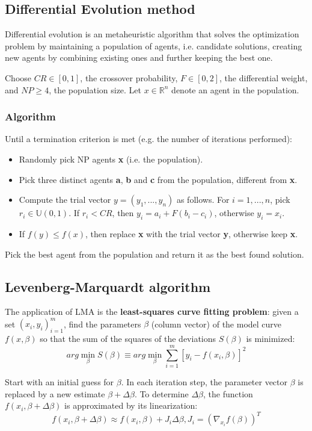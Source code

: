 \documentclass[a4paper,article,14pt]{extarticle}
\begin{document}
	\subsection{Differential Evolution method}
	Differential evolution is an metaheuristic algorithm that solves the optimization problem by maintaining a population of agents, i.e. candidate solutions, creating new agents by combining existing ones and further keeping the best one.
	
	Choose $CR \in [0,1]$, the crossover probability, $F \in[0,2]$, the differential weight, and $NP \geq 4$, the population size. Let $x\in \mathbb{R}^n$ denote an agent in the population.
	
	\subsubsection*{Algorithm}
	Until a termination criterion is met (e.g. the number of iterations performed):
	\begin{itemize}
		\item Randomly pick NP agents \textbf{x} (i.e. the population).
		\item Pick three distinct agents \textbf{a}, \textbf{b} and \textbf{c} from the population, different from \textbf{x}.
		\item Compute the trial vector $y=(y_1,...,y_n)$ as follows. For $i=1,...,n$, pick $r_i\in \mathbb{U}(0,1)$. If $r_i < CR$, then $y_i=a_i + F(b_i - c_i)$, otherwise $y_i = x_i$.
		\item If $f(y)\leq f(x)$, then replace \textbf{x} with the trial vector \textbf{y}, otherwise keep \textbf{x}.
	\end{itemize}
	Pick the best agent from the population and return it as the best found solution.
	
	
	\subsection{Levenberg-Marquardt algorithm}
	The application of LMA is the \textbf{least-squares curve fitting problem}: given a set $(x_i, y_i)_{i=1}^m$, find the parameters $\beta$ (column vector) of the model curve $f(x,\beta)$ so that the sum of the squares of the deviations $S(\beta)$ is minimized: $$arg\min_{\beta} S(\beta)\equiv arg\min_{\beta} \sum_{i=1}^{m}[y_i - f(x_i,\beta)]^2$$
	
	Start with an initial guess for $\beta$. In each iteration step, the parameter vector $\beta$ is replaced by a new estimate $\beta + \Delta \beta$. To determine $\Delta \beta$, the function $f(x_i,\beta + \Delta \beta)$ is approximated by its linearization: $$f(x_i, \beta + \Delta \beta) \approx f(x_i, \beta) + J_i \Delta\beta, J_i = (\nabla_{x_i}f(\beta))^T$$
	
\end{document}
